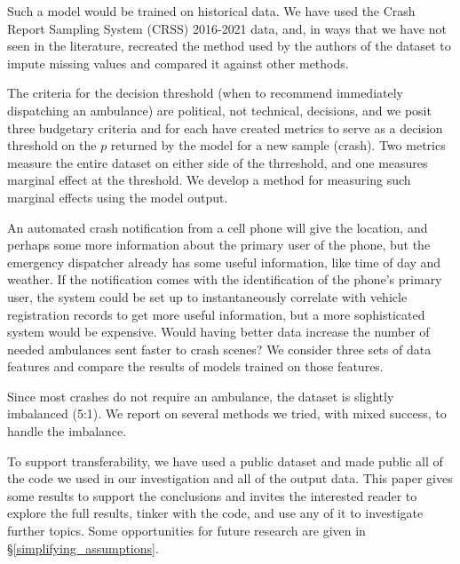 Such a model would be trained on historical data.  We have used the Crash Report Sampling System (CRSS) 2016-2021 data, and, in ways that we have not seen in the literature, recreated the method used by the authors of the dataset to impute missing values and compared it against other methods.  

The criteria for the decision threshold (when to recommend immediately dispatching an ambulance) are political, not technical, decisions, and we posit three budgetary criteria and for each have created metrics to serve as a decision threshold on the $p$ returned by the model for a new sample (crash).  Two metrics measure the entire dataset on either side of the thrreshold, and one measures marginal effect at the threshold.  We develop a method for measuring such marginal effects using the model output. 

An automated crash notification from a cell phone will give the location, and perhaps some more information about the primary user of the phone, but the emergency dispatcher already has some useful information, like time of day and weather.  If the notification comes with the identification of the phone's primary user, the system could be set up to instantaneously correlate with vehicle registration records to get more useful information, but a more sophisticated system would be expensive.  Would having better data increase the number of needed ambulances sent faster to crash scenes?  We consider three sets of data features and compare the results of models trained on those features.  

Since most crashes do not require an ambulance, the dataset is slightly imbalanced (5:1).  We report on several methods we tried, with mixed success, to handle the imbalance.

To support transferability, we have used a public dataset and made public all of the code we used in our investigation and all of the output data.  This paper gives some results to support the conclusions and invites the interested reader to explore the full results, tinker with the code, and use any of it to investigate further topics.  Some opportunities for future research are given in \S \ref{simplifying_assumptions}.







